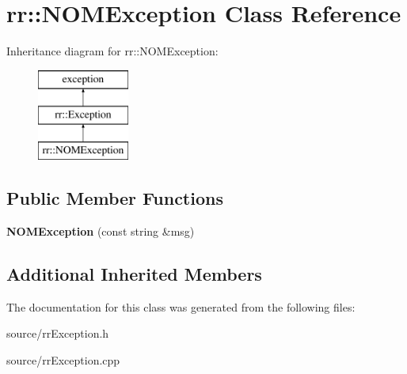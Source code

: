 \hypertarget{classrr_1_1_n_o_m_exception}{\section{rr\-:\-:N\-O\-M\-Exception Class Reference}
\label{classrr_1_1_n_o_m_exception}
}
Inheritance diagram for rr\-:\-:N\-O\-M\-Exception\-:\begin{figure}[H]
\begin{center}
\leavevmode
\includegraphics[height=3.000000cm]{classrr_1_1_n_o_m_exception}
\end{center}
\end{figure}
\subsection*{Public Member Functions}
\begin{DoxyCompactItemize}
\item 
\hypertarget{classrr_1_1_n_o_m_exception_a47cd1e8dd995b9fc89523fbcf1263ec2}{{\bfseries N\-O\-M\-Exception} (const string \&msg)}\label{classrr_1_1_n_o_m_exception_a47cd1e8dd995b9fc89523fbcf1263ec2}

\end{DoxyCompactItemize}
\subsection*{Additional Inherited Members}


The documentation for this class was generated from the following files\-:\begin{DoxyCompactItemize}
\item 
source/rr\-Exception.\-h\item 
source/rr\-Exception.\-cpp\end{DoxyCompactItemize}
